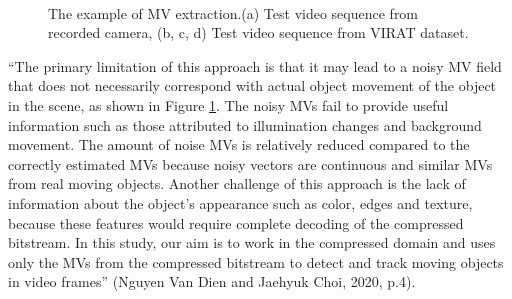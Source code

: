\begin{figure}
\centering
{}
\\
 \caption{ The example of MV extraction.(a) Test video sequence from recorded camera, (b, c, d) Test video sequence from VIRAT dataset.}
 \label{fig:noise}
\end{figure}

“The primary limitation of this approach is that it may lead to a noisy MV field that does not necessarily correspond with actual object movement of the object in the scene, as shown in Figure \ref{fig:noise}. The noisy MVs fail to provide useful information such as those attributed to illumination changes and background movement. The amount of noise MVs is relatively reduced compared to the correctly estimated MVs because noisy vectors are continuous and similar MVs from real moving objects. Another challenge of this approach is the lack of information about the object’s appearance such as color, edges and texture, because these features would require complete decoding of the compressed bitstream. In this study, our aim is to work in the compressed domain and uses only the MVs from the compressed bitstream to detect and track moving objects in video frames” (Nguyen Van Dien and Jaehyuk Choi, 2020, p.4).

